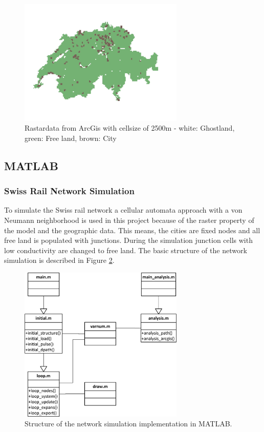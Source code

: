 \documentclass[11pt]{scrartcl}
\begin{document}
\begin{figure}[H]
	\centering
	\includegraphics[width=0.7\textwidth]{figures/map_2500_cities}
	\caption{Rastardata from ArcGis with cellsize of 2500m - white: Ghostland, green: Free land, brown: City}
	\label{fig:map_cities}
\end{figure}


\subsection{MATLAB}

\subsubsection{Swiss Rail Network Simulation}

To simulate the Swiss rail network a cellular automata approach with a von Neumann neighborhood is used in this project because of the raster property of the model and the geographic data. This means, the cities are fixed nodes and all free land is populated with junctions. During the simulation junction cells with low conductivity are changed to free land. The basic structure of the network simulation is described in Figure \ref{fig:structure}.

\begin{figure}[H]
	\centering
	\includegraphics[width=0.7\textwidth]{figures/source_code}
	\caption{Structure of the network simulation implementation in MATLAB.}
	\label{fig:structure}
\end{figure}
\end{document}
